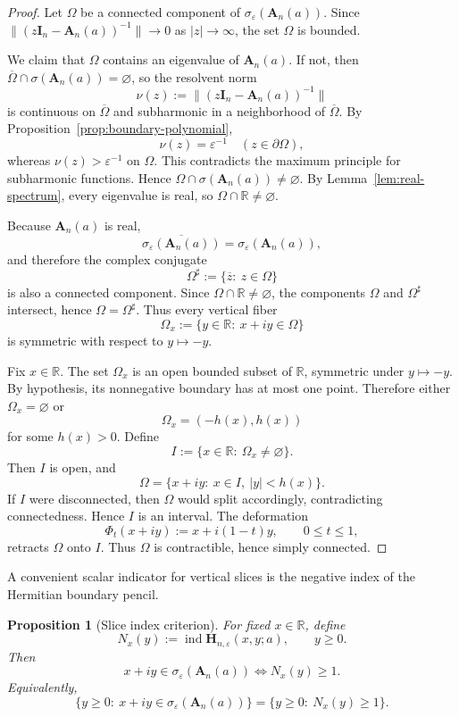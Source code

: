 \documentclass[11pt]{article}
\newtheorem{proposition}[theorem]{Proposition}
\DeclareMathOperator{\ind}{ind}
\newcommand{\R}{\mathbb{R}}
\begin{document}
\begin{proof}
Let \(\Omega\) be a connected component of \(\sigma_\varepsilon(\mathbf A_n(a))\). Since \(\|(z\mathbf I_n-\mathbf A_n(a))^{-1}\|\to 0\) as \(|z|\to\infty\), the set \(\Omega\) is bounded.

We claim that \(\Omega\) contains an eigenvalue of \(\mathbf A_n(a)\). If not, then \(\overline\Omega\cap \sigma(\mathbf A_n(a))=\varnothing\), so the resolvent norm
\[
\nu(z):=\|(z\mathbf I_n-\mathbf A_n(a))^{-1}\|
\]
is continuous on \(\overline\Omega\) and subharmonic in a neighborhood of \(\overline\Omega\). By Proposition~\ref{prop:boundary-polynomial},
\[
\nu(z)=\varepsilon^{-1}\quad (z\in\partial\Omega),
\]
whereas \(\nu(z)>\varepsilon^{-1}\) on \(\Omega\). This contradicts the maximum principle for subharmonic functions. Hence \(\Omega\cap \sigma(\mathbf A_n(a))\neq\varnothing\). By Lemma~\ref{lem:real-spectrum}, every eigenvalue is real, so \(\Omega\cap\R\neq\varnothing\).

Because \(\mathbf A_n(a)\) is real,
\[
\overline{\sigma_\varepsilon(\mathbf A_n(a))}=\sigma_\varepsilon(\mathbf A_n(a)),
\]
and therefore the complex conjugate
\[
\Omega^\sharp:=\{\overline z:\ z\in\Omega\}
\]
is also a connected component. Since \(\Omega\cap\R\neq\varnothing\), the components \(\Omega\) and \(\Omega^\sharp\) intersect, hence \(\Omega=\Omega^\sharp\). Thus every vertical fiber
\[
\Omega_x:=\{y\in\R:\ x+iy\in\Omega\}
\]
is symmetric with respect to \(y\mapsto -y\).

Fix \(x\in\R\). The set \(\Omega_x\) is an open bounded subset of \(\R\), symmetric under \(y\mapsto -y\). By hypothesis, its nonnegative boundary has at most one point. Therefore either \(\Omega_x=\varnothing\) or
\[
\Omega_x=(-h(x),h(x))
\]
for some \(h(x)>0\). Define
\[
I:=\{x\in\R:\ \Omega_x\neq\varnothing\}.
\]
Then \(I\) is open, and
\[
\Omega=\{x+iy:\ x\in I,\ |y|<h(x)\}.
\]
If \(I\) were disconnected, then \(\Omega\) would split accordingly, contradicting connectedness. Hence \(I\) is an interval. The deformation
\[
\Phi_t(x+iy):=x+i(1-t)y,
\qquad 0\le t\le 1,
\]
retracts \(\Omega\) onto \(I\). Thus \(\Omega\) is contractible, hence simply connected.
\end{proof}

A convenient scalar indicator for vertical slices is the negative index of the Hermitian boundary pencil.

\begin{proposition}[Slice index criterion]\label{prop:slice-index}
For fixed \(x\in\R\), define
\[
N_x(y):=\ind \mathbf H_{n,\varepsilon}(x,y;a),
\qquad y\ge 0.
\]
Then
\[
x+iy\in \sigma_\varepsilon(\mathbf A_n(a))
\iff
N_x(y)\ge 1.
\]
Equivalently,
\[
\{y\ge 0:\ x+iy\in \sigma_\varepsilon(\mathbf A_n(a))\}
=
\{y\ge 0:\ N_x(y)\ge 1\}.
\]
\end{proposition}
\end{document}
